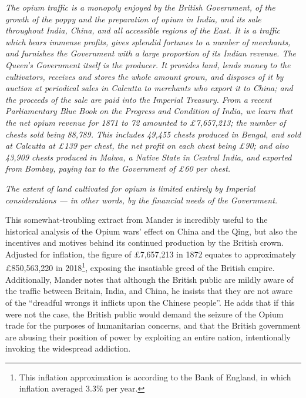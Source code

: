 \documentclass{article}
\newcommand{\textrule}{\noindent\makebox[\linewidth]{\rule{\linewidth}{0.4pt}}}
\begin{document}
\textit{The opium traffic is a monopoly enjoyed by the British Government, of the growth of the poppy and the preparation of opium in India, and its sale throughout India, China, and all accessible regions of the East. It is a traffic which bears immense profits, gives splendid fortunes to a number of merchants, and furnishes the Government with a large proportion of its Indian revenue. The Queen's Government itself is the producer. It provides land, lends money to the cultivators, receives and stores the whole amount grown, and disposes of it by auction at periodical sales in Calcutta to merchants who export it to China; and the proceeds of the sale are paid into the Imperial Treasury. From a recent Parliamentary Blue Book on the Progress and Condition of India, we learn that the net opium revenue for 1871 to 72 amounted to \pounds7,657,213; the number of chests sold being 88,789. This includes 49,455 chests produced in Bengal, and sold at Calcutta at \pounds139 per chest, the net profit on each chest being \pounds90; and also 43,909 chests produced in Malwa, a Native State in Central India, and exported from Bombay, paying tax to the Government of \pounds60 per chest.}

\textit{The extent of land cultivated for opium is limited entirely by Imperial considerations --- in other words, by the financial needs of the Government. \\}
\vspace*{0.6em}
\textrule

This somewhat-troubling extract from Mander is incredibly useful to the historical analysis of the Opium wars' effect on China and the Qing, but also the incentives and motives behind its continued production by the British crown. Adjusted for inflation, the figure of \pounds7,657,213 in 1872 equates to approximately \pounds850,563,220 in 2018\footnote{This inflation approximation is according to the Bank of England, in which inflation averaged 3.3\% per year.}, exposing the insatiable greed of the British empire. Additionally, Mander notes that although the British public are mildly aware of the traffic between Britain, India, and China, he insists that they are not aware of the ``dreadful wrongs it inflicts upon the
Chinese people''. He adds that if this were not the case, the British public would demand the seizure of the Opium trade for the purposes of humanitarian concerns, and that the British government are abusing their position of power by exploiting an entire nation, intentionally invoking the widespread addiction.
\end{document}
